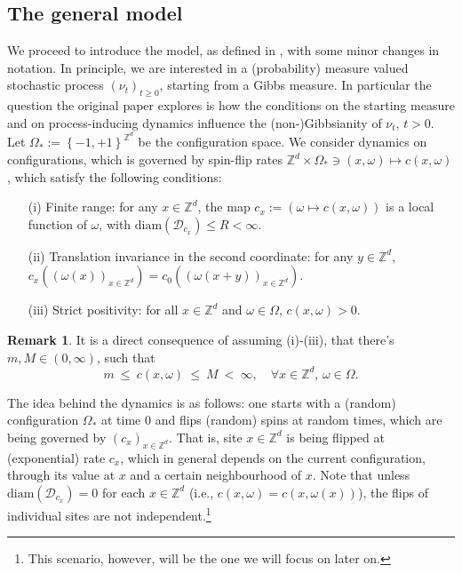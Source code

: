 \documentclass[12pt]{article}
\newcommand{\D}{\mathcal{D}}
\newcommand{\Z}{\mathbb{Z}}
\newcommand{\set}[1]{\left\{#1\right\}}
\newcommand{\1}{\mathbbm{1}}
\newcommand{\5}{\vspace{0.5cm}}
\theoremstyle{definition}
\newtheorem{rem}[thm]{Remark}
\begin{document}
\subsection{The general model}

We proceed to introduce the model, as defined in \cite{EFHR}, with some minor changes in notation. In principle, we are interested in a (probability) measure valued stochastic process $(\nu_t)_{t\geq 0}$, starting from a Gibbs measure. In particular the question the original paper explores is how the conditions on the starting measure and on process-inducing dynamics influence the (non-)Gibbsianity of $\nu_t$, $t>0$. \\

Let $\Omega_*:=\set{-1,+1}^{\Z^d}$ be the configuration space. We consider dynamics on configurations, which is governed by spin-flip rates $\Z^d\times\Omega_*\ni(x,\omega)\mapsto c(x,\omega)$, which satisfy the following conditions:
\begin{itemize}
	\item[(i)] Finite range: for any $x\in\Z^d$, the map $c_x:=(\omega\mapsto c(x,\omega))$ is a local function of $\omega$, with $\mathrm{diam}(\D_{c_x})\leq R<\infty$.
	\item[(ii)] Translation invariance in the second coordinate: for any $y\in\Z^d$, $c_x((\omega(x))_{x\in\Z^d})=c_0((\omega(x+y))_{x\in\Z^d})$.
	\item[(iii)] Strict positivity: for all $x\in\Z^d$ and $\omega\in\Omega$, $c(x,\omega)>0$.
\end{itemize}

\begin{rem}
It is a direct consequence of assuming (i)-(iii), that there's $m,M\in(0,\infty)$, such that 
$$m ~\leq~ c(x,\omega) ~\leq~ M ~<~ \infty, \quad \forall x\in\Z^d,\,\omega\in\Omega.$$
\end{rem}

The idea behind the dynamics is as follows: one starts with a (random) configuration $\Omega_*$ at time $0$ and flips (random) spins at random times, which are being governed by $(c_x)_{x\in\Z^d}$. That is, site $x\in\Z^d$ is being flipped at (exponential) rate $c_x$, which in general depends on the current configuration, through its value at $x$ and a certain neighbourhood of $x$. Note that unless $\mathrm{diam}(\D_{c_x})=0$ for each $x\in\Z^d$ (i.e., $c(x,\omega)=c(x,\omega(x))$), the flips of individual sites are not independent.\footnote{This scenario, however, will be the one we will focus on later on.} \\
\end{document}
